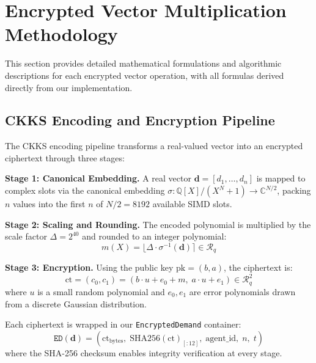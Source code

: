 \documentclass[conference,12pt]{IEEEtran}
\begin{document}
\section{Encrypted Vector Multiplication Methodology}
\label{sec:methodology}

This section provides detailed mathematical formulations and algorithmic descriptions for each encrypted vector operation, with all formulas derived directly from our implementation.

\subsection{CKKS Encoding and Encryption Pipeline}

The CKKS encoding pipeline transforms a real-valued vector into an encrypted ciphertext through three stages:

\noindent\textbf{Stage 1: Canonical Embedding.} A real vector $\mathbf{d} = [d_1, \ldots, d_n]$ is mapped to complex slots via the canonical embedding $\sigma: \mathbb{Q}[X]/(X^N+1) \to \mathbb{C}^{N/2}$, packing $n$ values into the first $n$ of $N/2 = 8192$ available SIMD slots.

\noindent\textbf{Stage 2: Scaling and Rounding.} The encoded polynomial is multiplied by the scale factor $\Delta = 2^{40}$ and rounded to an integer polynomial:
\begin{equation}
    m(X) = \lfloor \Delta \cdot \sigma^{-1}(\mathbf{d}) \rceil \in \mathcal{R}_q
\end{equation}

\noindent\textbf{Stage 3: Encryption.} Using the public key $\text{pk} = (b, a)$, the ciphertext is:
\begin{equation}
    \text{ct} = (c_0, c_1) = (b \cdot u + e_0 + m, \; a \cdot u + e_1) \in \mathcal{R}_q^2
\end{equation}
where $u$ is a small random polynomial and $e_0, e_1$ are error polynomials drawn from a discrete Gaussian distribution.

Each ciphertext is wrapped in our \texttt{EncryptedDemand} container:
\begin{equation}
    \texttt{ED}(\mathbf{d}) = \left(\text{ct}_{\text{bytes}}, \; \text{SHA256}(\text{ct})_{[:12]}, \; \text{agent\_id}, \; n, \; t\right)
\end{equation}
where the SHA-256 checksum enables integrity verification at every stage.
\end{document}
